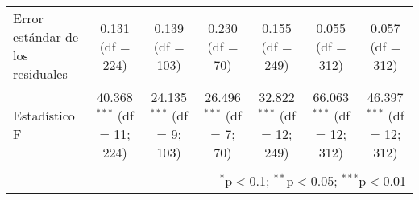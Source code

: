 \documentclass[spanish,11pt]{article}
\begin{document}
\begin{table}[!htbp]
\begin{tabular}{@{\extracolsep{5pt}}lcccccc}
Error estándar de los residuales & 0.131 (df = 224) & 0.139 (df = 103) & 0.230 (df = 70) & 0.155 (df = 249) & 0.055 (df = 312) & 0.057 (df = 312) \\ 
Estadístico F & 40.368$^{***}$ (df = 11; 224) & 24.135$^{***}$ (df = 9; 103) & 26.496$^{***}$ (df = 7; 70) & 32.822$^{***}$ (df = 12; 249) & 66.063$^{***}$ (df = 12; 312) & 46.397$^{***}$ (df = 12; 312) \\ 
\hline 
\hline \\[-1.8ex] 
\multicolumn{7}{r}{$^{*}$p$<$0.1; $^{**}$p$<$0.05; $^{***}$p$<$0.01} \\ 
\end{tabular} 
\end{table} 
\end{document}
